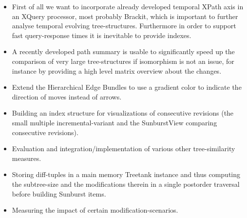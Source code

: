 \begin{itemize}
\item First of all we want to incorporate already developed temporal XPath axis in an XQuery processor, most probably Brackit\cite{Brackit}, which is important to further analyse temporal evolving tree-structures. Furthermore in order to support fast query-response times it is inevitable to provide indexes. 
\item A recently developed path summary is usable to significantly speed up the comparison of very large tree-structures if isomorphism is not an issue, for instance by providing a high level matrix overview about the changes. 
\item Extend the Hierarchical Edge Bundles to use a gradient color to indicate the direction of moves instead of arrows.
\item Building an index structure for visualizations of consecutive revisions (the small multiple incremental-variant and the SunburstView comparing consecutive revisions).
\item Evaluation and integration/implementation of various other tree-similarity measures.
\item Storing diff-tuples in a main memory Treetank instance and thus computing the subtree-size and the modifications therein in a single postorder traversal before building Sunburst items.
\item Measuring the impact of certain modification-scenarios.
\end{itemize} 
